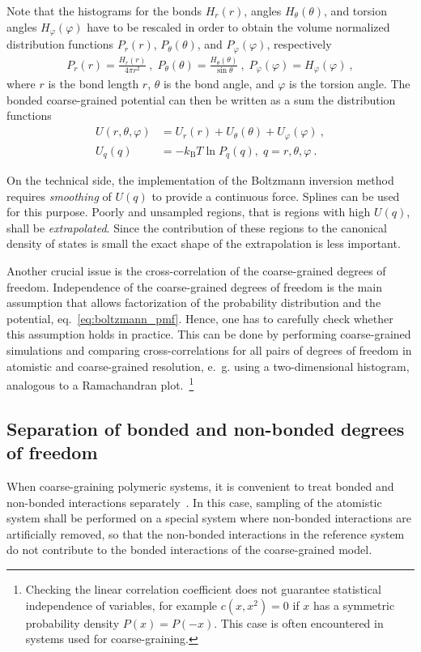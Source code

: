 Note that the histograms for the bonds $H_r(r)$, angles $H_\theta(\theta)$, and torsion angles $H_\varphi(\varphi)$ have to be rescaled in order to obtain the volume normalized distribution functions $P_r(r)$, $P_\theta(\theta)$, and $P_\varphi(\varphi)$, respectively
%
\begin{align}
    P_r(r) = \frac{H_r(r)}{4\pi r^2}~,\;
    P_\theta(\theta) = \frac{H_\theta(\theta)}{\sin \theta}~,\;
    P_\varphi(\varphi) = H_\varphi (\varphi)~,
    \label{eq:boltzmann_norm}
\end{align}
where $r$ is the bond length $r$, $\theta$ is the bond angle, and $\varphi$ is the torsion angle. The bonded coarse-grained potential can then be written as a sum the distribution functions
%
\begin{align}
    \label{eq:boltzmann_pmf}
    U({r}, \theta, \varphi) &= U_r({r}) + U_{\theta}(\theta) + U_{\varphi}(\varphi)~, \\
    U_q({q}) &= - k_\text{B} T \ln P_q( q ),\; q=r, \theta, \varphi~.
    \nonumber
\end{align}

On the technical side, the implementation of the Boltzmann inversion method requires {\em smoothing} of $U(q)$ to provide a continuous force. Splines can be used for this purpose. Poorly and unsampled regions, that is regions with high $U(q)$, shall be {\em extrapolated}. Since the contribution of these regions to the canonical density of states is small the exact shape of the extrapolation is less important.

Another crucial issue is the cross-correlation of the coarse-grained degrees of freedom. Independence of the coarse-grained degrees of freedom is the main assumption that allows factorization of the probability distribution and the potential, eq.~\ref{eq:boltzmann_pmf}. Hence, one has to carefully check whether this assumption holds in practice. This can be done by performing coarse-grained simulations and comparing cross-correlations for all pairs of degrees of freedom in atomistic and coarse-grained resolution, e.~g. using a two-dimensional histogram, analogous to a Ramachandran plot.~\footnote{Checking the linear correlation coefficient does not guarantee statistical independence of variables, for example $c(x, x^2)=0$ if $x$ has a symmetric probability density $P(x) = P(-x)$. This case is often encountered in systems used for coarse-graining.}

\subsection{Separation of bonded and non-bonded degrees of freedom}
When coarse-graining polymeric systems, it is convenient to treat bonded and non-bonded interactions separately~\cite{Tschoep:1998}. In this case, sampling of the atomistic system shall be performed on a special system where non-bonded interactions are artificially removed, so that the non-bonded interactions in the reference system do not contribute to the bonded interactions of the coarse-grained model.

